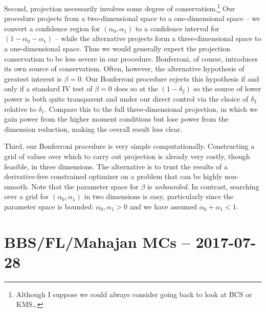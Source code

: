 \documentclass[12pt]{article}
\begin{document}
Second, projection necessarily involves some degree of conservatism.\footnote{Although I suppose we could always consider going back to look at BCS or KMS\ldots}
Our procedure projects from a two-dimensional space to a one-dimensional space -- we convert a confidence region for $(\alpha_0, \alpha_1)$ to a confidence interval for $(1 - \alpha_0 - \alpha_1)$ -- while the alternative projects form a three-dimensional space to a one-dimensional space.
Thus we would generally expect the projection conservatism to be less severe in our procedure.
Bonferroni, of course, introduces its own source of conservatism.
Often, however, the alternative hypothesis of greatest interest is $\beta = 0$.
Our Bonferroni procedure rejects this hypothesis if and only if a standard IV test of $\beta=0$ does so at the $(1 - \delta_2)$ so the source of lower power is both quite transparent and under our direct control via the choice of $\delta_2$ relative to $\delta_1$.
Compare this to the full three-dimensional projection, in which we gain power from the higher moment conditions but lose power from the dimension reduction, making the overall result less clear.

Third, our Bonferroni procedure is very simple computationally.
Constructing a grid of values over which to carry out projection is already very costly, though feasible, in three dimensions.
The alternative is to trust the results of a derivative-free constrained optimizer on a problem that can be highly non-smooth.
Note that the parameter space for $\beta$ is \emph{unbounded}.
In contrast, searching over a grid for $(\alpha_0, \alpha_1)$ in two dimensions is easy, particularly since the parameter space is bounded: $\alpha_0, \alpha_1>0$ and we have assumed $\alpha_0 + \alpha_1 < 1$.



\section{BBS/FL/Mahajan MCs -- 2017-07-28}
\end{document}
